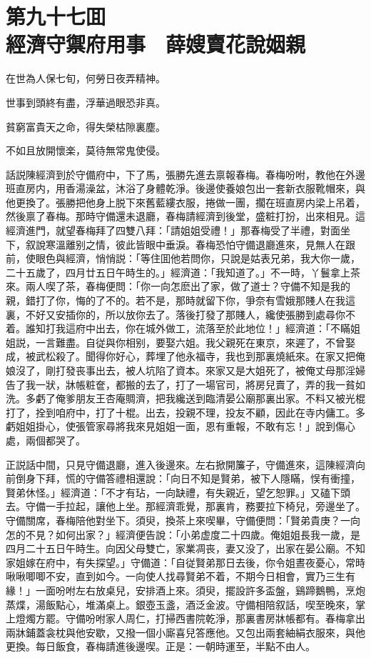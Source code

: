 
\chapter*{第九十七囬　\\經濟守禦府用事　薛嫂賣花說姻親}


\begin{myquote}
在世為人保七旬，何勞日夜弄精神。

世事到頭終有盡，浮華過眼恐非真。

貧窮富貴天之命，得失榮枯隙裏塵。

不如且放開懷楽，莫待無常鬼使侵。
\end{myquote}

話説陳經濟到於守備府中，下了馬，張勝先進去禀報春梅。春梅吩咐，教他在外邊班直房内，用香湯澡盆，沐浴了身體乾淨。後邊使養娘包出一套新衣服靴帽來，與他更換了。張勝把他身上脱下來舊藍縷衣服，捲做一團，擱在班直房内梁上吊着，然後禀了春梅。那時守備還未退廳，春梅請經濟到後堂，盛粧打扮，出來相見。這經濟進門，就望春梅拜了四雙八拜：「請姐姐受禮！」那春梅受了半禮，對面坐下，叙說寒溫離别之情，彼此皆眼中垂淚。春梅恐怕守備退廳進來，見無人在跟前，使眼色與經濟，悄悄説：「等住囬他若問你，只說是姑表兄弟，我大你一歲，二十五歲了，四月廿五日午時生的。」經濟道：「我知道了。」不一時，丫鬟拿上茶來。兩人喫了茶，春梅便問：「你一向怎麽出了家，做了道士？守備不知是我的親，錯打了你，悔的了不的。若不是，那時就留下你，爭奈有雪娥那賤人在我這裏，不好又安插你的，所以放你去了。落後打發了那賤人，纔使張勝到處尋你不着。誰知打我這府中出去，你在城外做工，流落至於此地位！」經濟道：「不瞞姐姐説，一言難盡。自従與你相别，要娶六姐。我父親死在東京，來遲了，不曾娶成，被武松殺了。聞得你好心，葬埋了他永福寺，我也到那裏燒紙來。在家又把俺娘沒了，剛打發丧事出去，被人坑陷了資本。來家又是大姐死了，被俺丈母那淫婦告了我一狀，牀帳粧奩，都搬的去了，打了一場官司，將房兒賣了，弄的我一貧如洗。多虧了俺爹朋友王杏庵賙濟，把我纔送到臨清晏公廟那裏出家。不料又被光棍打了，拴到咱府中，打了十棍。出去，投親不理，投友不顧，因此在寺内傭工。多虧姐姐掛心，使張管家尋將我來見姐姐一面，恩有重報，不敢有忘！」說到傷心處，兩個都哭了。

正説話中間，只見守備退廳，進入後邊來。左右掀開簾子，守備進來，這陳經濟向前倒身下拜，慌的守備答禮相還說：「向日不知是賢弟，被下人隱瞞，悮有衝撞，賢弟休怪。」經濟道：「不才有玷，一向缺禮，有失親近，望乞恕罪。」又磕下頭去。守備一手拉起，讓他上坐。那經濟乖覺，那裏肯，務要拉下椅兒，旁邊坐了。守備關席，春梅陪他對坐下。須臾，換茶上來喫畢，守備便問：「賢弟貴庚？一向怎的不見？如何出家？」經濟便告說：「小弟虚度二十四歲。俺姐姐長我一歲，是四月二十五日午時生。向因父母雙亡，家業凋丧，妻又没了，出家在晏公廟。不知家姐嫁在府中，有失探望。」守備道：「自従賢弟那日去後，你令姐晝夜憂心，常時啾啾唧唧不安，直到如今。一向使人找尋賢弟不着，不期今日相會，實乃三生有緣！」一面吩咐左右放桌兒，安排酒上來。須臾，擺設許多盃盤，鷄蹄鵝鴨，烹炮蒸煠，湯飯點心，堆滿桌上。銀壺玉盞，酒泛金波。守備相陪叙話，喫至晚來，掌上燈燭方罷。守備吩咐家人周仁，打掃西書院乾淨，那裏書房牀帳都有。春梅拿出兩牀鋪蓋衾枕與他安歇，又撥一個小廝喜兒答應他。又包出兩套紬絹衣服來，與他更換。每日飯食，春梅請進後邊喫。正是：一朝時運至，半點不由人。

